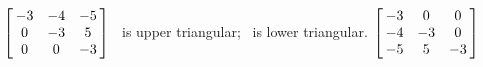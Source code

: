 {$\left[\hskip -3pt \begin{array}{ccc} -3&-4&-5\\  0&-3&5
\\  0&0&-3\end{array}\hskip -3pt \right] $} 
{\tta\ is upper triangular; \ttat\ is lower triangular. $\left[\hskip -3pt \begin{array}{ccc} -3&0&0\\  -4&-3&0
\\  -5&5&-3\end{array}\hskip -3pt \right]$}
 

 

